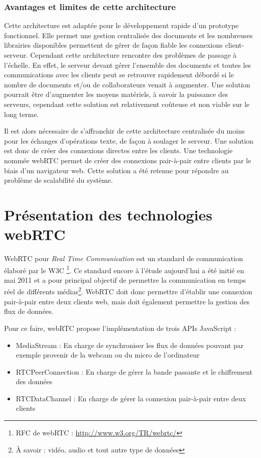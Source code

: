 \documentclass{tnreport}
\begin{document}
\subsubsection{Avantages et limites de cette architecture}

Cette architecture est adaptée pour le développement rapide d'un prototype fonctionnel. Elle permet une gestion centralisée des documents et les nombreuses librairies disponibles permettent de gérer de façon fiable les connexions client-serveur. Cependant cette architecture rencontre des problèmes de passage à l'échelle. En effet, le serveur devant gérer l'ensemble des documents et toutes les communications avec les clients peut se retrouver rapidement débordé si le nombre de documents et/ou de collaborateurs venait à augmenter. Une solution pourrait être d'augmenter les moyens matériels, à savoir la puissance des serveurs, cependant cette solution est relativement coûteuse et non viable sur le long terme.

Il est alors nécessaire de s'affranchir de cette architecture centralisée du moins pour les échanges d'opérations texte, de façon à soulager le serveur. Une solution est donc de créer des connexions directes entre les clients. Une technologie nommée webRTC permet de créer des connexions pair-à-pair entre clients par le biais d'un navigateur web. Cette solution a été retenue pour répondre au problème de scalabilité du système.




\section{Présentation des technologies webRTC}
WebRTC pour \emph{Real Time Communication} est un standard de communication élaboré par le W3C \footnote{RFC de webRTC : \url{http://www.w3.org/TR/webrtc/}}. Ce standard encore à l'étude aujourd'hui a été initié en mai 2011 et a pour principal objectif de permettre la communication en temps réel de différents médias\footnote{À savoir : vidéo, audio et tout autre type de données}. WebRTC doit donc permettre d'établir une connexion pair-à-pair entre deux clients web, mais doit également permettre la gestion des flux de données. 

Pour ce faire, webRTC propose l'implémentation de trois APIs JavaScript :
\begin{itemize}
  \item MediaStream : En charge de synchroniser les flux de données pouvant par exemple provenir de la webcam ou du micro de l'ordinateur
  \item RTCPeerConnection : En charge de gérer la bande passante et le chiffrement des données
  \item RTCDataChannel : En charge de gérer la connexion pair-à-pair entre deux clients\\
\end{itemize}
\end{document}
